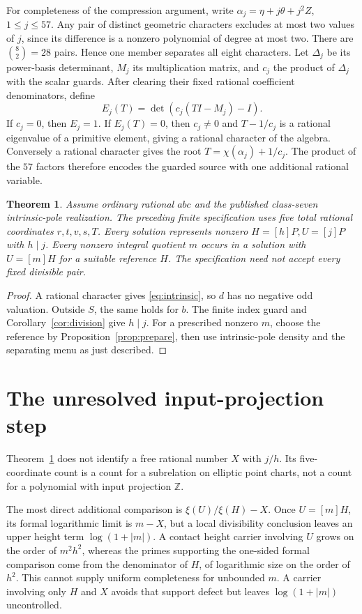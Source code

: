 \documentclass[11pt]{article}
\newtheorem{theorem}{Theorem}[section]
\newcommand{\Z}{\mathbb Z}
\begin{document}
For completeness of the compression argument, write
\(\alpha_j=\eta+j\theta+j^2Z\), \(1\le j\le57\).
Any pair of distinct geometric characters excludes at most two
values of \(j\), since its difference is a nonzero polynomial
of degree at most two. There are \(\binom82=28\) pairs.
Hence one member separates all eight characters.
Let \(\Delta_j\) be its power-basis determinant, \(M_j\) its
multiplication matrix, and \(c_j\) the product of \(\Delta_j\)
with the scalar guards. After clearing their fixed rational
coefficient denominators, define
\[
                         E_j(T)=\det(c_j(TI-M_j)-I).
\]
If \(c_j=0\), then \(E_j=1\). If \(E_j(T)=0\), then
\(c_j\ne0\) and \(T-1/c_j\) is a rational eigenvalue of a
primitive element, giving a rational character of the algebra.
Conversely a rational character gives the root
\(T=\chi(\alpha_j)+1/c_j\). The product of the \(57\) factors
therefore encodes the guarded source with one additional
rational variable.

\begin{theorem}\label{thm:subrelation}
Assume ordinary rational \(abc\) and the published class-seven
intrinsic-pole realization. The preceding finite specification
uses five total rational coordinates \(r,t,v,s,T\).
Every solution represents nonzero \(H=[h]P,U=[j]P\) with
\(h\mid j\). Every nonzero integral quotient \(m\) occurs in a
solution with \(U=[m]H\) for a suitable reference \(H\).
The specification need not accept every fixed divisible pair.
\end{theorem}
\begin{proof}
A rational character gives \eqref{eq:intrinsic}, so \(d\) has
no negative odd valuation. Outside \(S\), the same holds for
\(b\). The finite index guard and Corollary~\ref{cor:division}
give \(h\mid j\).
For a prescribed nonzero \(m\), choose the reference by
Proposition~\ref{prop:prepare}, then use intrinsic-pole density
and the separating menu as just described.
\end{proof}

\section{The unresolved input-projection step}

Theorem~\ref{thm:subrelation} does not identify a free rational
number \(X\) with \(j/h\). Its five-coordinate count is a count
for a subrelation on elliptic point charts, not a count for a
polynomial with input projection \(\Z\).

The most direct additional comparison is
\(\xi(U)/\xi(H)-X\). Once \(U=[m]H\), its formal logarithmic
limit is \(m-X\), but a local divisibility conclusion leaves
an upper height term \(\log(1+|m|)\).
A contact height carrier involving \(U\) grows on the order
of \(m^2h^2\), whereas the primes supporting the one-sided
formal comparison come from the denominator of \(H\), of
logarithmic size on the order of \(h^2\). This cannot supply
uniform completeness for unbounded \(m\).
A carrier involving only \(H\) and \(X\) avoids that support
defect but leaves \(\log(1+|m|)\) uncontrolled.
\end{document}
